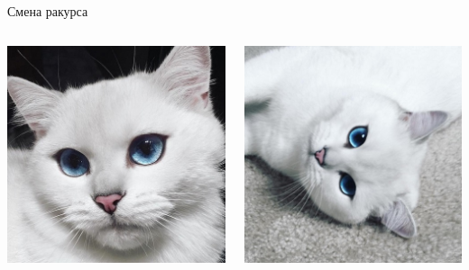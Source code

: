\documentclass[aspectratio=169, professionalfonts]{beamer}
\begin{document}
\begin{frame}{Смена ракурса}
    \begin{columns}
        \begin{column}{.325\linewidth}
            \centering
            \includegraphics[width=\linewidth]{figures/fig16-cat.jpg}
        \end{column}
        \begin{column}{.325\linewidth}
            \centering
            \includegraphics[width=\linewidth]{figures/fig17-cat.jpg}

\end{column}
\end{columns}
\end{frame}
\end{document}
